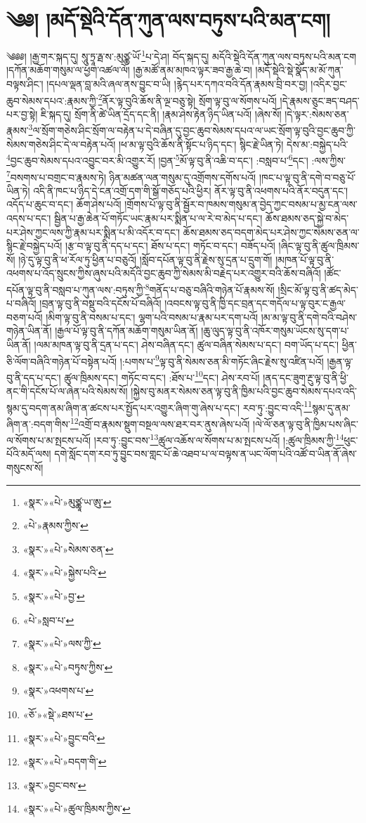 \chapter{༄༅། །མདོ་སྡེའི་དོན་ཀུན་ལས་བཏུས་པའི་མན་ངག།}༄༅༅། །རྒྱ་གར་སྐད་དུ། སཱུ་ཏྲཱ་རྠ་ས་:མུཙྪ་ཡོ་\footnote{«སྣར་»«པེ་»མུཙྪཱ་ཡ་ཨུ་}པ་དེ་ཤ། བོད་སྐད་དུ། མདོའི་སྡེའི་དོན་ཀུན་ལས་བཏུས་པའི་མན་ངག །དཀོན་མཆོག་གསུམ་ལ་ཕྱག་འཚལ་ལོ། །རྒྱ་མཚོ་ནམ་མཁའ་ལྟར་ཟབ་རྒྱ་ཆེ་བ། །མདོ་སྡེའི་སྡེ་སྣོད་མ་མོ་ཀུན་བལྟས་ཤིང་། །དཔལ་ལྡན་བླ་མའི་ཞལ་ནས་བྱུང་བ་ཡི། །རྙེད་པར་དཀའ་བའི་དོན་རྣམས་བྲི་བར་བྱ། །འདིར་བྱང་ཆུབ་སེམས་དཔའ་:རྣམས་ཀྱི་\footnote{«པེ་»རྣམས་ཀྱིས་}ནོར་ལྟ་བུའི་ཆོས་ནི་ལྔ་བཅུ་སྟེ། སྲོག་ལྟ་བུ་ལ་སོགས་པའོ། །དེ་རྣམས་ཅུང་ཟད་བཤད་པར་བྱ་སྟེ། ཇི་སྐད་དུ། སྲོག་ནི་ཚེ་ཡིན་དྲོད་དང་ནི། །རྣམ་ཤེས་རྟེན་ཉིད་ཡིན་པའོ། །ཞེས་སོ། །དེ་ལྟར་:སེམས་ཅན་རྣམས་\footnote{«སྣར་»«པེ་»སེམས་ཅན་}ལ་སྲོག་གཅེས་ཤིང་སྲོག་ལ་བརྟེན་པ་དེ་བཞིན་དུ་བྱང་ཆུབ་སེམས་དཔའ་ལ་ཡང་སྲོག་ལྟ་བུའི་བྱང་ཆུབ་ཀྱི་སེམས་གཅེས་ཤིང་དེ་ལ་བརྟེན་པའོ། །ཕ་མ་ལྟ་བུའི་ཆོས་ནི་སྟོང་པ་ཉིད་དང་། སྙིང་རྗེ་ཡིན་ཏེ། དེས་མ་:བསྐྱེད་པའི་\footnote{«སྣར་»«པེ་»སྐྱེས་པའི་}བྱང་ཆུབ་སེམས་དཔའ་འབྱུང་བར་མི་འགྱུར་རོ། །བྱན་\footnote{«སྣར་»«པེ་»བྱ་}མོ་ལྟ་བུ་ནི་འཆི་བ་དང་། :བསླབ་པ་\footnote{«པེ་»སླབ་པ་}དང་། :ལས་ཀྱིས་\footnote{«སྣར་»«པེ་»ལས་ཀྱི་}བསགས་པ་བགྲང་བ་རྣམས་ཏེ། ཉིན་མཚན་ལན་གསུམ་དུ་འགྲོགས་དགོས་པའོ། །ཁང་པ་ལྟ་བུ་ནི་དགེ་བ་བཅུ་པོ་ཡིན་ཏེ། འདི་ནི་ཁང་པ་ཉིད་དེ་ངན་འགྲོ་དག་གི་སྒོ་གཅོད་པའི་ཕྱིར། ནོར་ལྟ་བུ་ནི་འཕགས་པའི་ནོར་བདུན་དང་། འདོད་པ་ཆུང་བ་དང་། ཆོག་ཤེས་པའོ། །གྲོགས་པོ་ལྟ་བུ་ནི་སྦྱོར་བ་ཁམས་གསུམ་ན་བྱེད་ཀྱང་བསམ་པ་མྱ་ངན་ལས་འདས་པ་དང་། སྦྱིན་པ་རྒྱ་ཆེན་པོ་གཏོང་ཡང་རྣམ་པར་སྨིན་པ་ལ་རེ་བ་མེད་པ་དང་། ཆོས་ཐམས་ཅད་སྐྱེ་བ་མེད་པར་ཤེས་ཀྱང་ལས་ཀྱི་རྣམ་པར་སྨིན་པ་མི་འདོར་བ་དང་། ཆོས་ཐམས་ཅད་བདག་མེད་པར་ཤེས་ཀྱང་སེམས་ཅན་ལ་སྙིང་རྗེ་བསྐྱེད་པའོ། །རྩ་བ་ལྟ་བུ་ནི་དད་པ་དང་། ཐོས་པ་དང་། གཏོང་བ་དང་། བཟོད་པའོ། །ཞིང་ལྟ་བུ་ནི་ཚུལ་ཁྲིམས་སོ། །ཉེ་དུ་ལྟ་བུ་ནི་ཕ་རོལ་ཏུ་ཕྱིན་པ་བཅུའོ། །སློབ་དཔོན་ལྟ་བུ་ནི་རྗེས་སུ་དྲན་པ་དྲུག་གོ། །མཁན་པོ་ལྟ་བུ་ནི་འཕགས་པ་འོད་སྲུངས་ཀྱིས་ཞུས་པའི་མདོའི་བྱང་ཆུབ་ཀྱི་སེམས་མི་བརྗེད་པར་འགྱུར་བའི་ཆོས་བཞིའོ། །ཚོང་དཔོན་ལྟ་བུ་ནི་བསླབ་པ་ཀུན་ལས་:བཏུས་ཀྱི་\footnote{«སྣར་»«པེ་»བཏུས་ཀྱིས་}གནོད་པ་བཅུ་བཞིའི་གཉེན་པོ་རྣམས་སོ། །སྲིང་མོ་ལྟ་བུ་ནི་ཚད་མེད་པ་བཞིའོ། །བྲན་ལྟ་བུ་ནི་བསྡུ་བའི་དངོས་པོ་བཞིའོ། །འབངས་ལྟ་བུ་ནི་ཁྱི་དང་བྲན་དང་གདོལ་པ་ལྟ་བུར་ང་རྒྱལ་བཅག་པའོ། །མིག་ལྟ་བུ་ནི་བསམ་པ་དང་། ལྷག་པའི་བསམ་པ་རྣམ་པར་དག་པའོ། །མ་མ་ལྟ་བུ་ནི་དགེ་བའི་བཤེས་གཉེན་ཡིན་ནོ། །རྒྱལ་པོ་ལྟ་བུ་ནི་དཀོན་མཆོག་གསུམ་ཡིན་ནོ། །ཆུ་ལུད་ལྟ་བུ་ནི་འཁོར་གསུམ་ཡོངས་སུ་དག་པ་ཡིན་ནོ། །ལམ་མཁན་ལྟ་བུ་ནི་དྲན་པ་དང་། ཤེས་བཞིན་དང་། ཚུལ་བཞིན་སེམས་པ་དང་། བག་ཡོད་པ་དང་། ཕྱིན་ཅི་ལོག་བཞིའི་གཉེན་པོ་བསྟེན་པའོ། །:པགས་པ་\footnote{«སྣར་»འཕགས་པ་}ལྟ་བུ་ནི་སེམས་ཅན་མི་གཏོང་ཞིང་རྗེས་སུ་འཛིན་པའོ། །རྒྱན་ལྟ་བུ་ནི་དད་པ་དང་། ཚུལ་ཁྲིམས་དང་། གཏོང་བ་དང་། :ཐོས་པ་\footnote{«ཅོ་»«སྡེ་»ཐས་པ་}དང་། ཤེས་རབ་པོ། །ནད་དང་ཟུག་རྔུ་ལྟ་བུ་ནི་ཕྱི་ནང་གི་དངོས་པོ་ལ་ཞེན་པའི་སེམས་སོ། །སྐྱེས་བུ་མནར་སེམས་ཅན་ལྟ་བུ་ནི་ཁྱིམ་པའི་བྱང་ཆུབ་སེམས་དཔའ་འདི་སྙམ་དུ་བདག་ནམ་ཞིག་ན་ཚངས་པར་སྤྱོད་པར་འགྱུར་ཞིག་གུ་ཞེས་པ་དང་། རབ་ཏུ་:བྱུང་བ་འདི་\footnote{«སྣར་»«པེ་»བྱུང་བའི་}སྙམ་དུ་ནམ་ཞིག་ན་:བདག་གིས་\footnote{«སྣར་»«པེ་»བདག་གི་}འགྲོ་བ་རྣམས་སྡུག་བསྔལ་ལས་ཐར་བར་ནུས་ཞེས་པའོ། །ལེ་ལོ་ཅན་ལྟ་བུ་ནི་ཁྱིམ་པས་ཞིང་ལ་སོགས་པ་མ་སྤངས་པའོ། །རབ་ཏུ་:བྱུང་བས་\footnote{«སྣར་»བྱང་བས་}ཚུལ་འཆོས་ལ་སོགས་པ་མ་སྤངས་པའོ། །:ཚུལ་ཁྲིམས་ཀྱི་\footnote{«སྣར་»«པེ་»ཚུལ་ཁྲིམས་ཀྱིས་}ཕུང་པོའི་མདོ་ལས། དགེ་སློང་དག་རབ་ཏུ་བྱུང་བས་གླང་པོ་ཆེ་འཐབ་པ་ལ་བལྟས་ན་ཡང་ལོག་པའི་འཚོ་བ་ཡིན་ནོ་ཞེས་གསུངས་སོ། 